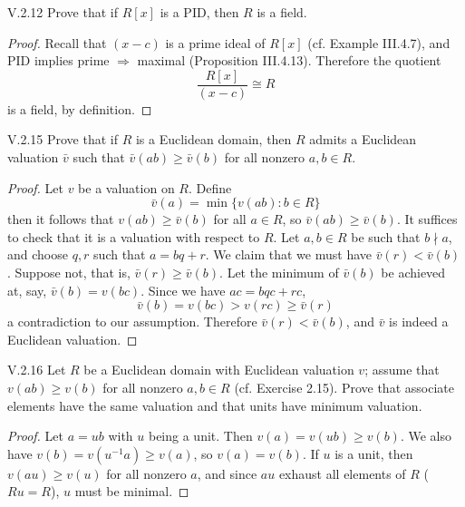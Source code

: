 \begin{problem}{V.2.12}
Prove that if $R[x]$ is a PID, then $R$ is a field.
\end{problem}
\begin{proof}
Recall that $(x-c)$ is a prime ideal of $R[x]$ (cf. Example III.4.7), and PID implies prime $\Rightarrow$ maximal (Proposition III.4.13). Therefore the quotient
\[
\frac{R[x]}{(x-c)} \cong R
\]
is a field, by definition.
\end{proof}

\begin{problem}{V.2.15}
Prove that if $R$ is a Euclidean domain, then $R$ admits a Euclidean valuation $\bar{v}$ such that $\bar{v}(ab) \geq \bar{v}(b)$ for all nonzero $a,b \in R$.
\end{problem}
\begin{proof}
Let $v$ be a valuation on $R$. Define 
\[
\bar{v}(a) = \min\{v(ab): b \in R\}
\]
then it follows that $v(ab) \geq \bar{v}(b)$ for all $a \in R$, so $\bar{v}(ab) \geq \bar{v}(b)$. It suffices to check that it is a valuation with respect to $R$. Let $a,b \in R$ be such that $b \nmid a$, and choose $q,r$ such that $a = bq+r$. We claim that we must have $\bar{v}(r) < \bar{v}(b)$. Suppose not, that is, $\bar{v}(r) \geq \bar{v}(b)$. Let the minimum of $\bar{v}(b)$ be achieved at, say, $\bar{v}(b) = v(bc)$. Since we have $ac = bqc+rc$,
\[
\bar{v}(b) = v(bc) > v(rc) \geq \bar{v}(r) 
\]
a contradiction to our assumption. Therefore $\bar{v}(r) < \bar{v}(b)$, and $\bar{v}$ is indeed a Euclidean valuation.
\end{proof}

\begin{problem}{V.2.16}
Let $R$ be a Euclidean domain with Euclidean valuation $v$; assume that $v(ab) \geq v(b)$ for all nonzero $a,b \in R$ (cf. Exercise 2.15). Prove that associate elements have the same valuation and that units have minimum valuation.
\end{problem}
\begin{proof}
Let $a = ub$ with $u$ being a unit. Then $v(a) = v(ub) \geq v(b)$. We also have $v(b) = v(u^{-1}a) \geq v(a)$, so $v(a) = v(b)$. If $u$ is a unit, then $v(au) \geq v(u)$ for all nonzero $a$, and since $au$ exhaust all elements of $R$ ($Ru = R$), $u$ must be minimal.
\end{proof}

